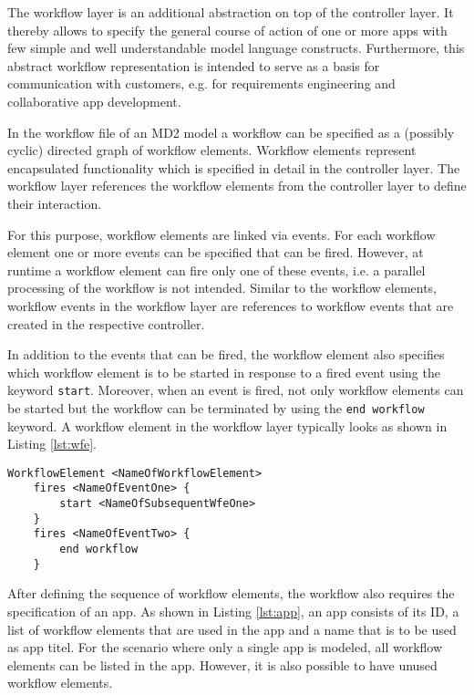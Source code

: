 
The workflow layer is an additional abstraction on top of the controller layer. It thereby allows to specify the general course of action of one or more apps with few simple and well understandable model language constructs. Furthermore, this abstract workflow representation is intended to serve as a basis for communication with customers, e.g. for requirements engineering and collaborative app development.

In the workflow file of an MD2 model a workflow can be specified as a (possibly cyclic) directed graph of workflow elements. Workflow elements represent encapsulated functionality which is specified in detail in the controller layer. The workflow layer references the workflow elements from the controller layer to define their interaction.

For this purpose, workflow elements are linked via events. For each workflow element one or more events can be specified that can be fired. However, at runtime a workflow element can fire only one of these events, i.e. a parallel processing of the workflow is not intended. Similar to the workflow elements, workflow events in the workflow layer are references to workflow events that are created in the respective controller.

In addition to the events that can be fired, the workflow element also specifies which workflow element is to be started in response to a fired event using the keyword {\lstinline!start!}. Moreover, when an event is fired, not only workflow elements can be started but the workflow can be terminated by using the \lstinline!end workflow! keyword.
A workflow element in the workflow layer typically looks as shown in Listing \ref{lst:wfe}.

\begin{lstlisting}[language=MD2, label=lst:wfe, caption=Workflow Elements in the Workflow Layer]
 WorkflowElement <NameOfWorkflowElement>
 	fires <NameOfEventOne> {
		start <NameOfSubsequentWfeOne>
	}
	fires <NameOfEventTwo> {
		end workflow
	}
\end{lstlisting}

After defining the sequence of workflow elements, the workflow also requires the specification of an app. As shown in Listing \ref{lst:app}, an app consists of its ID, a list of workflow elements that are used in the app and a name that is to be used as app titel. For the scenario where only a single app is modeled, all workflow elements can be listed in the app. However, it is also possible to have unused workflow elements.

